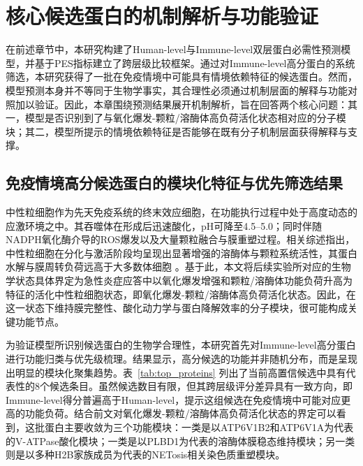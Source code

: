 \chapter{核心候选蛋白的机制解析与功能验证}

在前述章节中，本研究构建了Human-level与Immune-level双层蛋白必需性预测模型，并基于PES指标建立了跨层级比较框架。通过对Immune-level高分蛋白的系统筛选，本研究获得了一批在免疫情境中可能具有情境依赖特征的候选蛋白。然而，模型预测本身并不等同于生物学事实，其合理性必须通过机制层面的解释与功能对照加以验证。因此，本章围绕预测结果展开机制解析，旨在回答两个核心问题：其一，模型是否识别到了与氧化爆发-颗粒/溶酶体高负荷活化状态相对应的分子模块；其二，模型所提示的情境依赖特征是否能够在既有分子机制层面获得解释与支撑。

\section{免疫情境高分候选蛋白的模块化特征与优先筛选结果}

中性粒细胞作为先天免疫系统的终末效应细胞，在功能执行过程中处于高度动态的应激环境之中。其吞噬体在形成后迅速酸化，pH可降至4.5--5.0；同时伴随NADPH氧化酶介导的ROS爆发以及大量颗粒融合与膜重塑过程。相关综述指出，中性粒细胞在分化与激活阶段均呈现出显著增强的溶酶体与颗粒系统活性，其蛋白水解与膜周转负荷远高于大多数体细胞 \cite{arocacrevilln2024neutrophils}。基于此，本文将后续实验所对应的生物学状态具体界定为急性炎症应答中以氧化爆发增强和颗粒/溶酶体功能负荷升高为特征的活化中性粒细胞状态，即氧化爆发-颗粒/溶酶体高负荷活化状态。因此，在这一状态下维持膜完整性、酸化动力学与蛋白降解效率的分子模块，很可能构成关键功能节点。

为验证模型所识别候选蛋白的生物学合理性，本研究首先对Immune-level高分蛋白进行功能归类与优先级梳理。结果显示，高分候选的功能并非随机分布，而是呈现出明显的模块化聚集趋势。表~\ref{tab:top_proteins} 列出了当前高置信候选中具有代表性的8个候选条目。虽然候选数目有限，但其跨层级评分差异具有一致方向，即Immune-level得分普遍高于Human-level，提示这组候选在免疫情境中可能对应更高的功能负荷。结合前文对氧化爆发-颗粒/溶酶体高负荷活化状态的界定可以看到，这批蛋白主要收敛为三个功能模块：一类是以ATP6V1B2和ATP6V1A为代表的V-ATPase酸化模块；一类是以PLBD1为代表的溶酶体膜稳态维持模块；另一类则是以多种H2B家族成员为代表的NETosis相关染色质重塑模块。

